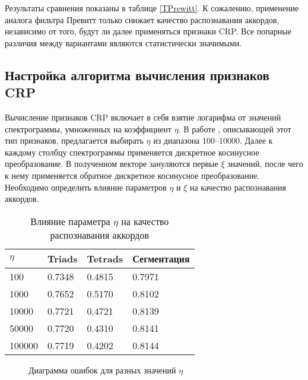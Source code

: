 Результаты сравнения показаны в таблице \ref{TPrewitt}. К сожалению, применение
аналога фильтра Превитт только снижает качество распознавания аккордов,
независимо от того, будут ли далее применяться признаки CRP. Все попарные
различия между вариантами являются статистически значимыми.

\subsection{Настройка алгоритма вычисления признаков CRP} \label{ssect3_crp}

Вычисление признаков CRP включает в себя взятие логарифма от значений
спектрограммы, умноженных на коэффициент $\eta$. В работе \cite{Mueller2009},
описывающей этот тип признаков, предлагается выбирать $\eta$ из диапазона
100--10000. Далее к каждому столбцу спектрограммы применяется дискретное
косинусное преобразование. В полученном векторе зануляются первые $\xi$
значений, после чего к нему применяется обратное дискретное косинусное
преобразование. Необходимо определить влияние параметров $\eta$ и $\xi$ на
качество распознавания аккордов.

\begin{table} [htbp]
  \centering
  \parbox{15cm}{\caption{Влияние параметра $\eta$ на качество распознавания
  аккордов} \label{Teta}}
  \begin{tabular}{|l|l|l|l|}
  \hline
  $\eta$ & Triads & Tetrads & Сегментация \\
  \hline
  100 & 0.7348 & 0.4815 & 0.7971 \\
  1000 & 0.7652 & 0.5170 & 0.8102 \\
  10000 & 0.7721 & 0.4721 & 0.8139 \\
  50000 & 0.7720 & 0.4310 & 0.8141 \\
  100000 & 0.7719 & 0.4202 & 0.8144 \\
  \hline
  \end{tabular}
\end{table}

\begin{figure}[h]
  \begin{minipage}[h]{0.49\linewidth}
  \end{minipage}
  \hfill
  \begin{minipage}[h]{0.49\linewidth}
  \end{minipage}
  \hfill
  \begin{minipage}[h]{0.49\linewidth}
  \end{minipage}
  \hfill
  \begin{minipage}[h]{0.49\linewidth}
  \end{minipage}
  \caption{Диаграмма ошибок для разных значений $\eta$}
  \label{img:logEta}
\end{figure}

